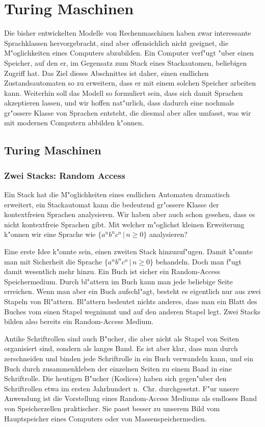 %
%
%
\chapter{Turing Maschinen\label{chapter-turing}}
Die bisher entwickelten Modelle von Rechenmaschinen haben zwar
interessante Sprachklassen hervorgebracht, sind aber offensichlich nicht
geeignet, die M"oglichkeiten eines Computers abzubilden. Ein
Computer verf"ugt "uber einen Speicher, auf den er, im Gegensatz zum
Stack eines Stackautomen, beliebigen Zugriff hat. Das Ziel dieses
Abschnittes ist daher, einen endlichen Zustandsautomaten so zu
erweitern, dass er mit einem solchen Speicher arbeiten kann.
Weiterhin soll das Modell so formuliert sein, dass sich damit
Sprachen akzeptieren lassen, und wir hoffen nat"urlich, dass dadurch
eine nochmals gr"ossere Klasse von Sprachen entsteht, die diesmal
aber alles umfasst, was wir mit modernen Computern abbilden k"onnen.

\section{Turing Maschinen}
\subsection{Zwei Stacks: Random Access}
Ein Stack hat die M"oglichkeiten eines endlichen Automaten dramatisch
erweitert, ein Stackautomat kann die bedeutend gr"ossere Klasse der
kontextfreien Sprachen analysieren. Wir haben aber auch schon gesehen,
dass es nicht kontextfreie Sprachen gibt. Mit welcher m"oglichst kleinen
Erweiterung k"onnen wir eine Sprache wie $\{a^nb^nc^n\,|\, n\ge 0\}$
analysieren?

Eine erste Idee k"onnte sein, einen zweiten Stack hinzuzuf"ugen.
Damit k"onnte man mit Sicherheit die Sprache $\{a^nb^nc^n\,|\,n\ge 0\}$
behandeln. Doch man f"ugt damit wesentlich mehr hinzu. Ein Buch ist
sicher ein Random-Access Speichermedium. Durch bl"attern im Buch
kann man jede beliebige Seite erreichen. Wenn man aber ein Buch
aufschl"agt, besteht es eigentlich nur aus zwei Stapeln von Bl"attern.
Bl"attern bedeutet nichts anderes, dass man ein Blatt des Buches vom
einen Stapel wegnimmt und auf den anderen Stapel legt. Zwei Stacks
bilden also bereits ein Random-Access Medium.

Antike Schriftrollen sind auch B"ucher, die aber nicht als Stapel
von Seiten organisiert sind, sondern als langes Band. Es ist aber klar,
dass man durch zerschneiden und binden jede Schriftrolle in ein
Buch verwandeln kann, und ein Buch durch zusammenkleben der einzelnen
Seiten zu einem Band in eine Schriftrolle.
Die heutigen B"ucher (Kodices) haben sich gegen"uber den Schriftrollen
etwa im ersten Jahrhundert n.~Chr. durchgesetzt.
F"ur unsere Anwendung ist die Vorstellung eines Random-Access Mediums
als endloses Band von Speicherzellen praktischer. Sie passt besser zu
unserem Bild vom Hauptspeicher eines Computers oder von Massenspeichermedien.
